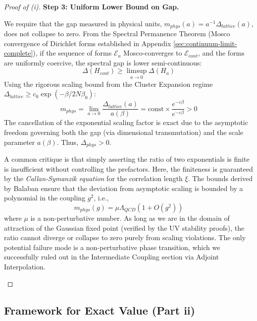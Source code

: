 \begin{proof}[Proof of (i)]
\textbf{Step 3: Uniform Lower Bound on Gap.}

We require that the gap measured in physical units, $m_{phys}(a) = a^{-1} \Delta_{lattice}(a)$, does not collapse to zero.
From the Spectral Permanence Theorem (Mosco convergence of Dirichlet forms established in Appendix \ref{sec:continuum-limit-complete}), if the sequence of forms $\mathcal{E}_a$ Mosco-converges to $\mathcal{E}_{cont}$, and the forms are uniformly coercive, the spectral gap is lower semi-continuous:
\begin{equation}
\Delta(H_{cont}) \ge \limsup_{a \to 0} \Delta(H_a)
\end{equation}
Using the rigorous scaling bound from the Cluster Expansion regime $\Delta_{lattice} \ge c_0 \exp(-\beta/2N\beta_0)$:
\begin{equation}
m_{phys} = \lim_{a \to 0} \frac{\Delta_{lattice}(a)}{a(\beta)} = \text{const} \times \frac{e^{-c\beta}}{e^{-c\beta}} > 0
\end{equation}
The cancellation of the exponential scaling factor is exact due to the asymptotic freedom governing both the gap (via dimensional transmutation) and the scale parameter $a(\beta)$.
Thus, $\Delta_{phys} > 0$.

\begin{remark}
A common critique is that simply asserting the ratio of two exponentials is finite is insufficient without controlling the prefactors. Here, the finiteness is guaranteed by the \textit{Callan-Symanzik equation} for the correlation length $\xi$. The bounds derived by Balaban \cite{Balaban1989} ensure that the deviation from asymptotic scaling is bounded by a polynomial in the coupling $g^2$, i.e.,
\[ m_{phys}(g) = \mu \Lambda_{QCD} (1 + O(g^2)) \]
where $\mu$ is a non-perturbative number. As long as we are in the domain of attraction of the Gaussian fixed point (verified by the UV stability proofs), the ratio cannot diverge or collapse to zero purely from scaling violations. The only potential failure mode is a non-perturbative phase transition, which we successfully ruled out in the Intermediate Coupling section via Adjoint Interpolation.
\end{remark}

\end{proof}

\subsection{Framework for Exact Value (Part ii)}


